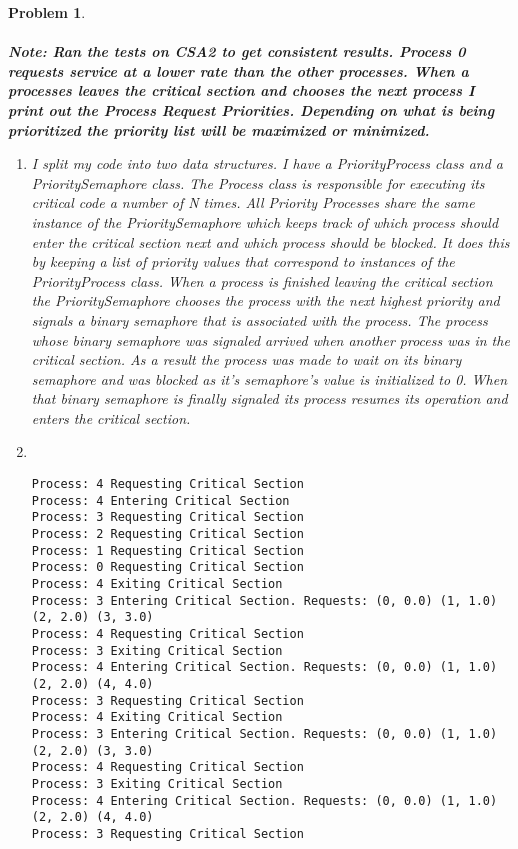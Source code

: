 \documentclass{article}
\theoremstyle{problemstyle}
\newtheorem{problem}{Problem}
\begin{document}
\begin{problem}~\\\\
\textbf {Note: Ran the tests on CSA2 to get consistent results. Process 0 requests service at a lower rate than the other processes. When a processes leaves the critical section and chooses the next process I print out the Process Request Priorities. Depending on what is being prioritized the priority list will be maximized or minimized.}
\begin{enumerate}[label=(\alph*)]
	\item I split my code into two data structures. I have a PriorityProcess class and a PrioritySemaphore class. The Process class is responsible for executing its critical code a number of N times. All Priority Processes share the same instance of the PrioritySemaphore which keeps track of which process should enter the critical section next and which process should be blocked. It does this by keeping a list of priority values that correspond to instances of the PriorityProcess class. When a process is finished leaving the critical section the PrioritySemaphore chooses the process with the next highest priority and signals a binary semaphore that is associated with the process. The process whose binary semaphore was signaled arrived when another process was in the critical section. As a result the process was made to wait on its binary semaphore and was blocked as it's semaphore's value is initialized to 0. When that binary semaphore is finally signaled its process resumes its operation and enters the critical section.
	\item ~
\begin{lstlisting}
Process: 4 Requesting Critical Section
Process: 4 Entering Critical Section
Process: 3 Requesting Critical Section
Process: 2 Requesting Critical Section
Process: 1 Requesting Critical Section
Process: 0 Requesting Critical Section
Process: 4 Exiting Critical Section
Process: 3 Entering Critical Section. Requests: (0, 0.0) (1, 1.0) (2, 2.0) (3, 3.0)
Process: 4 Requesting Critical Section
Process: 3 Exiting Critical Section
Process: 4 Entering Critical Section. Requests: (0, 0.0) (1, 1.0) (2, 2.0) (4, 4.0)
Process: 3 Requesting Critical Section
Process: 4 Exiting Critical Section
Process: 3 Entering Critical Section. Requests: (0, 0.0) (1, 1.0) (2, 2.0) (3, 3.0)
Process: 4 Requesting Critical Section
Process: 3 Exiting Critical Section
Process: 4 Entering Critical Section. Requests: (0, 0.0) (1, 1.0) (2, 2.0) (4, 4.0)
Process: 3 Requesting Critical Section

\end{lstlisting}
\end{enumerate}
\end{problem}
\end{document}
